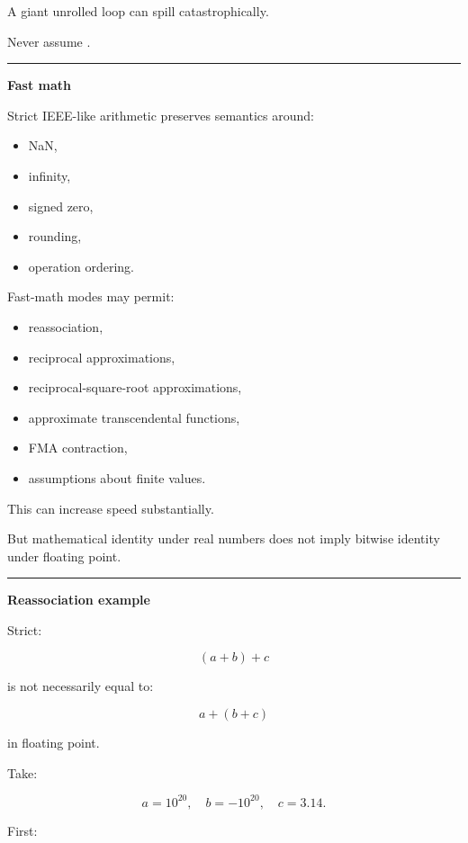 A giant unrolled loop can spill catastrophically.

Never assume .

\begin{center}\rule{0.5\linewidth}{0.5pt}\end{center}

\textbf{Fast math}

Strict IEEE-like arithmetic preserves semantics around:

\begin{itemize}
\tightlist
\item
  NaN,
\item
  infinity,
\item
  signed zero,
\item
  rounding,
\item
  operation ordering.
\end{itemize}

Fast-math modes may permit:

\begin{itemize}
\tightlist
\item
  reassociation,
\item
  reciprocal approximations,
\item
  reciprocal-square-root approximations,
\item
  approximate transcendental functions,
\item
  FMA contraction,
\item
  assumptions about finite values.
\end{itemize}

This can increase speed substantially.

But mathematical identity under real numbers does not imply bitwise identity under floating point.

\begin{center}\rule{0.5\linewidth}{0.5pt}\end{center}

\textbf{Reassociation example}

Strict:

\[
(a+b)+c
\]

is not necessarily equal to:

\[
a+(b+c)
\]

in floating point.

Take:

\[
a=10^{20},
\quad
b=-10^{20},
\quad
c=3.14.
\]

First:

